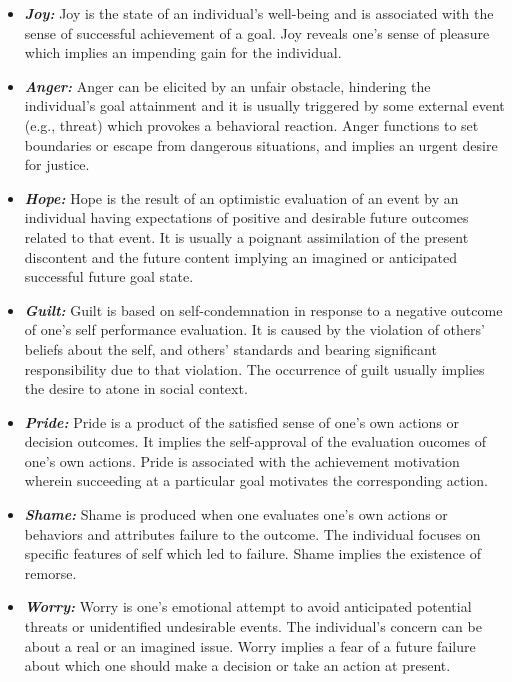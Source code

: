 \documentclass[letterpaper]{article}
\begin{document}
\begin{itemize}
  \item \textbf{\textit{Joy:}} Joy is the state of an individual's well-being
  and is associated with the sense of successful achievement of a goal. Joy
  reveals one's sense of pleasure which implies an impending gain for the
  individual.
  
  \item \textbf{\textit{Anger:}} Anger can be elicited by an unfair obstacle,
  hindering the individual's goal attainment and it is usually triggered by some
  external event (e.g., threat) which provokes a behavioral reaction. Anger
  functions to set boundaries or escape from dangerous situations, and implies
  an urgent desire for justice.
  
  \item \textbf{\textit{Hope:}} Hope is the result of an optimistic evaluation
  of an event by an individual having expectations of positive and desirable
  future outcomes related to that event. It is usually a poignant assimilation
  of the present discontent and the future content implying an imagined or
  anticipated successful future goal state.
  
  \item \textbf{\textit{Guilt:}} Guilt is based on self-condemnation in response
  to a negative outcome of one's self performance evaluation. It is caused by
  the violation of others' beliefs about the self, and others' standards and
  bearing significant responsibility due to that violation. The occurrence of
  guilt usually implies the desire to atone in social context.
  
  \item \textbf{\textit{Pride:}} Pride is a product of the satisfied sense of
  one's own actions or decision outcomes. It implies the self-approval of the
  evaluation oucomes of one's own actions. Pride is associated with the
  achievement motivation wherein succeeding at a particular goal motivates the
  corresponding action.
  
  \item \textbf{\textit{Shame:}} Shame is produced when one evaluates one's own
  actions or behaviors and attributes failure to the outcome. The individual
  focuses on specific features of self which led to failure. Shame implies the
  existence of remorse.
  
  \item \textbf{\textit{Worry:}} Worry is one's emotional attempt to avoid
  anticipated potential threats or unidentified undesirable events. The
  individual's concern can be about a real or an imagined issue. Worry implies a
  fear of a future failure about which one should make a decision or take an
  action at present.
\end{itemize}
\end{document}
